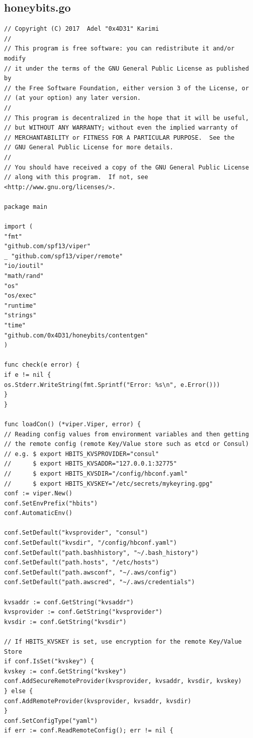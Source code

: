 \documentclass[grad,lot,lof,11pt,oneside,onehalfspace]{RUthesis}
\begin{document}
\subsection{honeybits.go }
\begin{lstlisting}
// Copyright (C) 2017  Adel "0x4D31" Karimi
//
// This program is free software: you can redistribute it and/or modify
// it under the terms of the GNU General Public License as published by
// the Free Software Foundation, either version 3 of the License, or
// (at your option) any later version.
//
// This program is decentralized in the hope that it will be useful,
// but WITHOUT ANY WARRANTY; without even the implied warranty of
// MERCHANTABILITY or FITNESS FOR A PARTICULAR PURPOSE.  See the
// GNU General Public License for more details.
//
// You should have received a copy of the GNU General Public License
// along with this program.  If not, see <http://www.gnu.org/licenses/>.

package main

import (
"fmt"
"github.com/spf13/viper"
_ "github.com/spf13/viper/remote"
"io/ioutil"
"math/rand"
"os"
"os/exec"
"runtime"
"strings"
"time"
"github.com/0x4D31/honeybits/contentgen"
)

func check(e error) {
if e != nil {
os.Stderr.WriteString(fmt.Sprintf("Error: %s\n", e.Error()))
}
}

func loadCon() (*viper.Viper, error) {
// Reading config values from environment variables and then getting
// the remote config (remote Key/Value store such as etcd or Consul)
// e.g. $ export HBITS_KVSPROVIDER="consul"
// 		$ export HBITS_KVSADDR="127.0.0.1:32775"
//		$ export HBITS_KVSDIR="/config/hbconf.yaml"
// 		$ export HBITS_KVSKEY="/etc/secrets/mykeyring.gpg"
conf := viper.New()
conf.SetEnvPrefix("hbits")
conf.AutomaticEnv()

conf.SetDefault("kvsprovider", "consul")
conf.SetDefault("kvsdir", "/config/hbconf.yaml")
conf.SetDefault("path.bashhistory", "~/.bash_history")
conf.SetDefault("path.hosts", "/etc/hosts")
conf.SetDefault("path.awsconf", "~/.aws/config")
conf.SetDefault("path.awscred", "~/.aws/credentials")

kvsaddr := conf.GetString("kvsaddr")
kvsprovider := conf.GetString("kvsprovider")
kvsdir := conf.GetString("kvsdir")

// If HBITS_KVSKEY is set, use encryption for the remote Key/Value Store
if conf.IsSet("kvskey") {
kvskey := conf.GetString("kvskey")
conf.AddSecureRemoteProvider(kvsprovider, kvsaddr, kvsdir, kvskey)
} else {
conf.AddRemoteProvider(kvsprovider, kvsaddr, kvsdir)
}
conf.SetConfigType("yaml")
if err := conf.ReadRemoteConfig(); err != nil {


\end{lstlisting}
\end{document}
